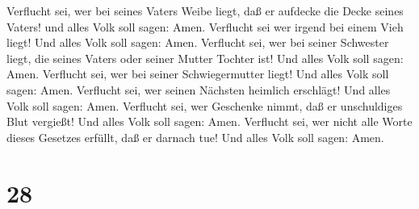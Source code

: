Verflucht sei, wer bei seines Vaters Weibe liegt, daß er aufdecke die
Decke seines Vaters! und alles Volk soll sagen: Amen. 
Verflucht sei wer irgend bei einem Vieh liegt! Und alles Volk soll
sagen: Amen.  Verflucht sei, wer bei seiner Schwester
liegt, die seines Vaters oder seiner Mutter Tochter ist! Und alles Volk
soll sagen: Amen.  Verflucht sei, wer bei seiner
Schwiegermutter liegt! Und alles Volk soll sagen: Amen. 
Verflucht sei, wer seinen Nächsten heimlich erschlägt! Und alles Volk
soll sagen: Amen.  Verflucht sei, wer Geschenke nimmt, daß
er unschuldiges Blut vergießt! Und alles Volk soll sagen: Amen.
 Verflucht sei, wer nicht alle Worte dieses Gesetzes
erfüllt, daß er darnach tue! Und alles Volk soll sagen: Amen.

\hypertarget{section-27}{%
\section{28}\label{section-27}}

